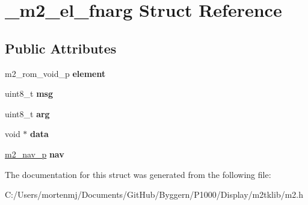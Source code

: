 \hypertarget{struct__m2__el__fnarg}{\section{\-\_\-m2\-\_\-el\-\_\-fnarg Struct Reference}
\label{struct__m2__el__fnarg}
}
\subsection*{Public Attributes}
\begin{DoxyCompactItemize}
\item 
\hypertarget{struct__m2__el__fnarg_a77229d49cbd059ad3c45b294df3f699f}{m2\-\_\-rom\-\_\-void\-\_\-p {\bfseries element}}\label{struct__m2__el__fnarg_a77229d49cbd059ad3c45b294df3f699f}

\item 
\hypertarget{struct__m2__el__fnarg_a1fc9908a3ffa48229bdfe1bf3de47f6a}{uint8\-\_\-t {\bfseries msg}}\label{struct__m2__el__fnarg_a1fc9908a3ffa48229bdfe1bf3de47f6a}

\item 
\hypertarget{struct__m2__el__fnarg_a5dbf2361424e41da287abfb7f7ef605c}{uint8\-\_\-t {\bfseries arg}}\label{struct__m2__el__fnarg_a5dbf2361424e41da287abfb7f7ef605c}

\item 
\hypertarget{struct__m2__el__fnarg_a814e0d7ae0b63bf5728cf77325f946ac}{void $\ast$ {\bfseries data}}\label{struct__m2__el__fnarg_a814e0d7ae0b63bf5728cf77325f946ac}

\item 
\hypertarget{struct__m2__el__fnarg_af688e12e2bc0a67875936a8b05958e61}{\hyperlink{struct__m2__nav__struct}{m2\-\_\-nav\-\_\-p} {\bfseries nav}}\label{struct__m2__el__fnarg_af688e12e2bc0a67875936a8b05958e61}

\end{DoxyCompactItemize}


The documentation for this struct was generated from the following file\-:\begin{DoxyCompactItemize}
\item 
C\-:/\-Users/mortenmj/\-Documents/\-Git\-Hub/\-Byggern/\-P1000/\-Display/m2tklib/m2.\-h\end{DoxyCompactItemize}
